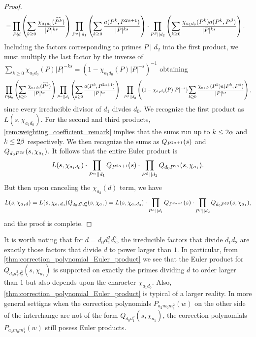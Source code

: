 \documentclass[12pt,reqno,oneside]{amsart}
\begin{document}
\begin{proof}
\begin{align*}
            &= \prod_{P \nmid d}\left(\sum_{k \ge 0}\frac{\chi_{a_{1}d_{0}}(\widehat{P^{k}})}{|P|^{ks}}\right)\prod_{P^{\alpha} \mid\mid d_{1}}\left(\sum_{k \ge 0}\frac{a(P^{k},P^{2\alpha+1})}{|P|^{ks}}\right) \cdot \prod_{P^{\beta} \mid\mid d_{2}}\left(\sum_{k \ge 0}\frac{\chi_{a_{1}d_{0}}(P^{k})a(P^{k},P^{\beta})}{|P|^{ks}}\right).
        \end{align*}
        Including the factors corresponding to primes $P \mid d_{2}$ into the first product, we must multiply the last factor by the inverse of $\sum_{k \ge 0}\chi_{a_{1}d_{0}}(P)|P|^{-ks} = (1-\chi_{a_{1}d_{0}}(P)|P|^{-s})^{-1}$ obtaining
        \[
            \prod_{P \nmid d_{0}}\left(\sum_{k \ge 0}\frac{\chi_{a_{1}d_{0}}(\widehat{P^{k}})}{|P|^{ks}}\right)\prod_{P^{\alpha} \mid\mid d_{1}}\left(\sum_{k \ge 0}\frac{a(P^{k},P^{2\alpha+1})}{|P|^{ks}}\right) \cdot \prod_{P^{\beta} \mid\mid d_{2}}\left((1-\chi_{a_{1}d_{0}}(P)|P|^{-s})\sum_{k \ge 0}\frac{\chi_{a_{1}d_{0}}(P^{k})a(P^{k},P^{\beta})}{|P|^{ks}}\right),
        \]
        since every irreducible divisor of $d_{1}$ divdes $d_{0}$. We recognize the first product as $L(s,\chi_{a_{1}d_{0}})$. For the second and third products, \cref{rem:weighting_coefficient_remark} implies that the sums run up to $k \le 2\alpha$ and $k \le 2\beta$ respectively. We then recognize the sums as $Q_{P^{2\alpha+1}}(s)$ and $Q_{d_{0}P^{2\beta}}(s,\chi_{a_{1}})$. It follows that the entire Euler product is
        \[
            L(s,\chi_{a_{1}d_{0}}) \cdot \prod_{P^{\alpha} \mid\mid d_{1}}Q_{P^{2\alpha+1}}(s) \cdot \prod_{P^{\beta} \mid\mid d_{2}}Q_{d_{0}P^{2\beta}}(s,\chi_{a_{1}}).
        \]
        But then upon canceling the $\chi_{a_{2}}(d)$ term, we have
        \[
            L(s,\chi_{a_{1}d}) = L(s,\chi_{a_{1}d_{0}})Q_{d_{0}d_{1}^{2}d_{2}^{2}}(s,\chi_{a_{1}}) = L(s,\chi_{a_{1}d_{0}}) \cdot \prod_{P^{\alpha} \mid\mid d_{1}}Q_{P^{2\alpha+1}}(s) \cdot \prod_{P^{\beta} \mid\mid d_{2}}Q_{d_{0}P^{2\beta}}(s,\chi_{a_{1}}),
        \]
        and the proof is complete.
    \end{proof}

    It is worth noting that for $d = d_{0}d_{1}^{2}d_{2}^{2}$, the irreducible factors that divide $d_{1}d_{2}$ are exactly those factors that divide $d$ to power larger than $1$. In particular, from \cref{thm:correction_polynomial_Euler_product} we see that the Euler product for $Q_{d_{0}d_{1}^{2}d_{2}^{2}}(s,\chi_{a_{1}})$ is supported on exactly the primes dividing $d$ to order larger than $1$ but also depends upon the character $\chi_{a_{1}d_{0}}$. Also, \cref{thm:correction_polynomial_Euler_product} is typical of a larger reality. In more general settigns when the correction polynomials $P_{a_{2}m_{0}m_{1}^{2}}(w)$ on the other side of the interchange are not of the form $Q_{d_{0}d_{1}^{2}}(s,\chi_{a_{1}})$, the correction polynomials $P_{a_{2}m_{0}m_{1}^{2}}(w)$ still posess Euler products.
\end{document}
